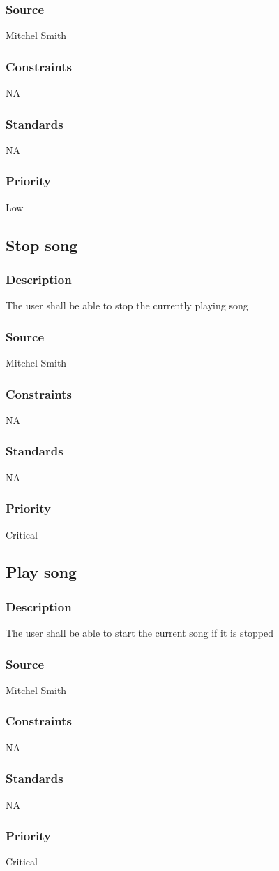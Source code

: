 \subsubsection{Source}
Mitchel Smith
\subsubsection{Constraints}
NA
\subsubsection{Standards}
NA
\subsubsection{Priority}
Low


\subsection{Stop song}
\subsubsection{Description}
The user shall be able to stop the currently playing song
\subsubsection{Source}
Mitchel Smith
\subsubsection{Constraints}
NA
\subsubsection{Standards}
NA
\subsubsection{Priority}
Critical


\subsection{Play song}
\subsubsection{Description}
The user shall be able to start the current song if it is stopped
\subsubsection{Source}
Mitchel Smith
\subsubsection{Constraints}
NA
\subsubsection{Standards}
NA
\subsubsection{Priority}
Critical

